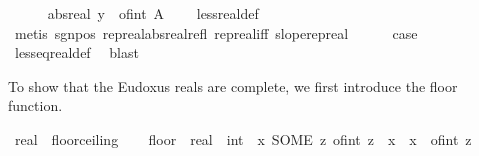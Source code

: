 \begin{isabellebody}
\ \ \ \ \isamarkupfalse%
\ {\isachardoublequoteopen}abs{\isacharunderscore}{\kern0pt}real\ y\ {\isacharless}{\kern0pt}\ of{\isacharunderscore}{\kern0pt}int\ {\isacharparenleft}{\kern0pt}A\ {\isacharplus}{\kern0pt}\ {}{\isacharparenright}{\kern0pt}{\isachardoublequoteclose}\ \isamarkupfalse%
\ less{\isacharunderscore}{\kern0pt}real{\isacharunderscore}{\kern0pt}def\ \isamarkupfalse%
\ {\isacharparenleft}{\kern0pt}metis\ sgn{\isacharunderscore}{\kern0pt}pos\ rep{\isacharunderscore}{\kern0pt}real{\isacharunderscore}{\kern0pt}abs{\isacharunderscore}{\kern0pt}real{\isacharunderscore}{\kern0pt}refl\ rep{\isacharunderscore}{\kern0pt}real{\isacharunderscore}{\kern0pt}iff\ slope{\isacharunderscore}{\kern0pt}rep{\isacharunderscore}{\kern0pt}real{\isacharparenright}{\kern0pt}\isanewline
\ \ \ \ \isamarkupfalse%
\ {\isacharquery}{\kern0pt}case\ \isamarkupfalse%
\ less{\isacharunderscore}{\kern0pt}eq{\isacharunderscore}{\kern0pt}real{\isacharunderscore}{\kern0pt}def\ \isamarkupfalse%
\ blast\isanewline
\ \ \isamarkupfalse%
\isanewline
{}\isamarkupfalse%
%
\endisatagproof
{\isafoldproof}%
%
\isadelimproof
%
\endisadelimproof
%
\isadelimdocument
%
\endisadelimdocument
%
\isatagdocument
%
\isamarkuptrue%
%
\endisatagdocument
{\isafolddocument}%
%
\isadelimdocument
%
\endisadelimdocument
%
\begin{isamarkuptext}%
To show that the Eudoxus reals are complete, we first introduce the floor function.%
\end{isamarkuptext}\isamarkuptrue%
\isamarkupfalse%
\ real\ {\isacharcolon}{\kern0pt}{\isacharcolon}{\kern0pt}\ floor{\isacharunderscore}{\kern0pt}ceiling\isanewline
{}\isanewline
\isanewline
{}\isamarkupfalse%
\ \isanewline
\ \ {\isachardoublequoteopen}{\isacharparenleft}{\kern0pt}floor\ {\isacharcolon}{\kern0pt}{\isacharcolon}{\kern0pt}\ {\isacharparenleft}{\kern0pt}real\ {\isasymRightarrow}\ int{\isacharparenright}{\kern0pt}{\isacharparenright}{\kern0pt}\ {\isacharequal}{\kern0pt}\ {\isacharparenleft}{\kern0pt}{\isasymlambda}x{\isachardot}{\kern0pt}\ {\isacharparenleft}{\kern0pt}SOME\ z{\isachardot}{\kern0pt}\ of{\isacharunderscore}{\kern0pt}int\ z\ {\isasymle}\ x\ {\isasymand}\ x\ {\isacharless}{\kern0pt}\ of{\isacharunderscore}{\kern0pt}int\ z\ {\isacharplus}{\kern0pt}\ {}{\isacharparenright}{\kern0pt}{\isacharparenright}{\kern0pt}{\isachardoublequoteclose}\isanewline

\end{isabellebody}
